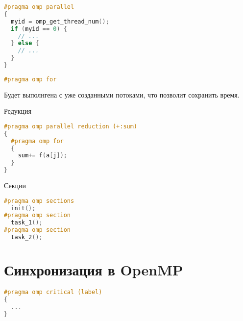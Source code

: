 \begin{frame}[fragile]

\begin{lstlisting}[language=C++,basicstyle=\ttfamily,keywordstyle=\color{blue},basicstyle=\scriptsize]
#pragma omp parallel
{
  myid = omp_get_thread_num();
  if (myid == 0) {
    // ...
  } else {
    // ...
  }
}
\end{lstlisting}

\end{frame}

\begin{frame}[fragile]

\begin{lstlisting}[language=C++,basicstyle=\ttfamily,keywordstyle=\color{blue},basicstyle=\scriptsize]
#pragma omp for
\end{lstlisting}

Будет выполнгена с уже созданными потоками, что позволит сохранить время.

\end{frame}

\begin{frame}[fragile]{Редукция}

\begin{lstlisting}[language=C++,basicstyle=\ttfamily,keywordstyle=\color{blue},basicstyle=\scriptsize]
#pragma omp parallel reduction (+:sum)
{
  #pragma omp for
  {
    sum+= f(a[j]);
  }
}
\end{lstlisting}

\end{frame}

\begin{frame}[fragile]{Секции}

\begin{lstlisting}[language=C++,basicstyle=\ttfamily,keywordstyle=\color{blue},basicstyle=\scriptsize]
#pragma omp sections
  init();
#pragma omp section
  task_1();
#pragma omp section
  task_2();
\end{lstlisting}

\end{frame}

\section{Синхронизация в OpenMP}

\begin{frame}[fragile]

\begin{lstlisting}[language=C++,basicstyle=\ttfamily,keywordstyle=\color{blue},basicstyle=\scriptsize]
#pragma omp critical (label)
{
  ...
}
\end{lstlisting}

\end{frame}

